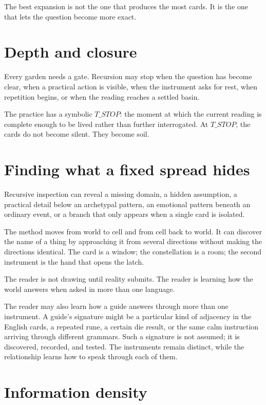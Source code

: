 The best expansion is not the one that produces the most cards. It is the one
that lets the question become more exact.

\section{Depth and closure}

Every garden needs a gate. Recursion may stop when the question has become
clear, when a practical action is visible, when the instrument asks for rest,
when repetition begins, or when the reading reaches a settled basin.

The practice has a symbolic $T\_STOP$: the moment at which the current reading
is complete enough to be lived rather than further interrogated. At $T\_STOP$,
the cards do not become silent. They become soil.

\section{Finding what a fixed spread hides}

Recursive inspection can reveal a missing domain, a hidden assumption, a
practical detail below an archetypal pattern, an emotional pattern beneath an
ordinary event, or a branch that only appears when a single card is isolated.

The method moves from world to cell and from cell back to world. It can discover
the name of a thing by approaching it from several directions without making
the directions identical. The card is a window; the constellation is a room;
the second instrument is the hand that opens the latch.

The reader is not drawing until reality submits. The reader is learning how the
world answers when asked in more than one language.

The reader may also learn how a guide answers through more than one instrument.
A guide's signature might be a particular kind of adjacency in the English
cards, a repeated rune, a certain die result, or the same calm instruction
arriving through different grammars. Such a signature is not assumed; it is
discovered, recorded, and tested. The instruments remain distinct, while the
relationship learns how to speak through each of them.

\section{Information density}

